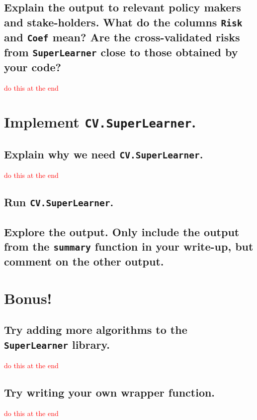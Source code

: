 \documentclass{article}\usepackage[]{graphicx}\usepackage[]{xcolor}
\begin{document}
  \subsection{Explain the output to relevant policy makers and stake-holders. What do the columns \texttt{Risk} and \texttt{Coef} mean? Are the cross-validated risks from \texttt{SuperLearner} close to those obtained by your code?}
  
\textcolor{red}{do this at the end}

\section{Implement \texttt{CV.SuperLearner}.}

  \subsection{Explain why we need \texttt{CV.SuperLearner}.}  
  
\textcolor{red}{do this at the end}
  
  \subsection{Run \texttt{CV.SuperLearner}.}  
  
  \subsection{Explore the output. Only include the output from the \texttt{summary} function in your write-up, but comment on the other output.}  

\section{Bonus!}

  \subsection{Try adding more algorithms to the \texttt{SuperLearner} library.}
  
\textcolor{red}{do this at the end}
  
  \subsection{Try writing your own wrapper function.}  
  
\textcolor{red}{do this at the end}
  
\end{document}
